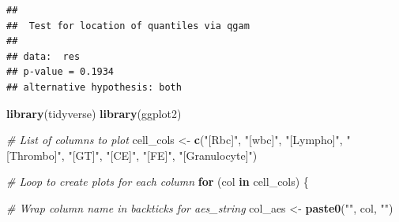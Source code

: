 \documentclass[
]{article}
\newenvironment{Shaded}{\begin{snugshade}}{\end{snugshade}}
\newcommand{\CommentTok}[1]{\textcolor[rgb]{0.56,0.35,0.01}{\textit{#1}}}
\newcommand{\ControlFlowTok}[1]{\textcolor[rgb]{0.13,0.29,0.53}{\textbf{#1}}}
\newcommand{\FunctionTok}[1]{\textcolor[rgb]{0.13,0.29,0.53}{\textbf{#1}}}
\newcommand{\NormalTok}[1]{#1}
\newcommand{\OtherTok}[1]{\textcolor[rgb]{0.56,0.35,0.01}{#1}}
\newcommand{\StringTok}[1]{\textcolor[rgb]{0.31,0.60,0.02}{#1}}
\begin{document}
\begin{verbatim}
## 
##  Test for location of quantiles via qgam
## 
## data:  res
## p-value = 0.1934
## alternative hypothesis: both
\end{verbatim}

\begin{Shaded}
\begin{Highlighting}[]
\FunctionTok{library}\NormalTok{(tidyverse)}
\FunctionTok{library}\NormalTok{(ggplot2)}

\CommentTok{\# List of columns to plot}
\NormalTok{cell\_cols }\OtherTok{\textless{}{-}} \FunctionTok{c}\NormalTok{(}\StringTok{"[Rbc]"}\NormalTok{, }\StringTok{"[wbc]"}\NormalTok{, }\StringTok{"[Lympho]"}\NormalTok{, }\StringTok{"[Thrombo]"}\NormalTok{, }\StringTok{"[GT]"}\NormalTok{, }\StringTok{"[CE]"}\NormalTok{, }\StringTok{"[FE]"}\NormalTok{, }\StringTok{"[Granulocyte]"}\NormalTok{)}

\CommentTok{\# Loop to create plots for each column}
\ControlFlowTok{for}\NormalTok{ (col }\ControlFlowTok{in}\NormalTok{ cell\_cols) \{}
  
  \CommentTok{\# Wrap column name in backticks for aes\_string}
\NormalTok{  col\_aes }\OtherTok{\textless{}{-}} \FunctionTok{paste0}\NormalTok{(}\StringTok{"\textasciigrave{}"}\NormalTok{, col, }\StringTok{"\textasciigrave{}"}\NormalTok{)}
  

\end{Highlighting}
\end{Shaded}
\end{document}

